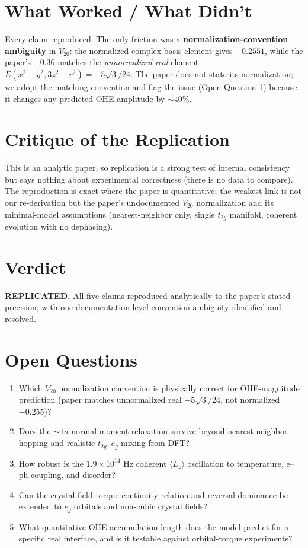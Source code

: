 \documentclass[11pt]{article}
\begin{document}
\section{What Worked / What Didn't}
Every claim reproduced. The only friction was a \textbf{normalization-convention ambiguity} in
$V_{20}$: the normalized complex-basis element gives $-0.2551$, while the paper's $-0.36$ matches
the \emph{unnormalized real} element $E(x^2-y^2,3z^2-r^2)=-5\sqrt3/24$. The paper does not state
its normalization; we adopt the matching convention and flag the issue (Open Question 1) because
it changes any predicted OHE amplitude by $\sim40\%$.

\section{Critique of the Replication}
This is an analytic paper, so replication is a strong test of internal consistency but says nothing
about experimental correctness (there is no data to compare). The reproduction is exact where the
paper is quantitative; the weakest link is not our re-derivation but the paper's undocumented $V_{20}$
normalization and its minimal-model assumptions (nearest-neighbor only, single $t_{2g}$ manifold,
coherent evolution with no dephasing).

\section{Verdict}
\textbf{REPLICATED.} All five claims reproduced analytically to the paper's stated precision, with
one documentation-level convention ambiguity identified and resolved.

\section*{Open Questions}
\begin{enumerate}
\item Which $V_{20}$ normalization convention is physically correct for OHE-magnitude prediction
(paper matches unnormalized real $-5\sqrt3/24$, not normalized $-0.255$)?
\item Does the $\sim1a$ normal-moment relaxation survive beyond-nearest-neighbor hopping and
realistic $t_{2g}$--$e_g$ mixing from DFT?
\item How robust is the $1.9\times10^{14}$ Hz coherent $\langle L_z\rangle$ oscillation to
temperature, e--ph coupling, and disorder?
\item Can the crystal-field-torque continuity relation and reversal-dominance be extended to $e_g$
orbitals and non-cubic crystal fields?
\item What quantitative OHE accumulation length does the model predict for a specific real interface,
and is it testable against orbital-torque experiments?
\end{enumerate}
\end{document}
